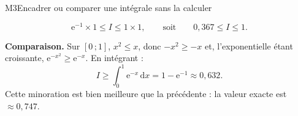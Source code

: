 \begin{fichemethode}{M3}{Encadrer ou comparer une intégrale sans la calculer}
{  %
  \[
    \mathrm{e}^{-1} \times 1 \leq I \leq 1 \times 1,
    \qquad\text{soit}\qquad 0{,}367 \leq I \leq 1 .
  \]

  \medskip
  \textbf{Comparaison.} Sur $[0\,;1]$, $x^2 \leq x$, donc
  $-x^2 \geq -x$ et, l'exponentielle étant croissante,
  $\mathrm{e}^{-x^2} \geq \mathrm{e}^{-x}$. En intégrant :
  \[
    I \geq \int_0^1 \mathrm{e}^{-x}\,\mathrm{d}x = 1-\mathrm{e}^{-1}
      \approx 0{,}632 .
  \]
  Cette minoration est bien meilleure que la précédente : la valeur exacte est
  $\approx 0{,}747$.
}

%
%
%
%
%
%
%


\end{fichemethode}
